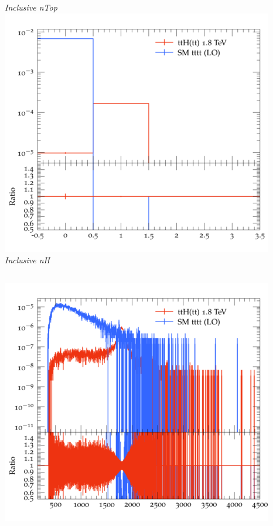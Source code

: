 \documentclass{beamer}
\begin{document}
\begin{frame}
\begin{columns}
\textit{\small Inclusive nTop}
\includegraphics[width=\textwidth]{../plots/ttH_1800/tttt_ttH/Inclusive_nH.png}\\
\textit{\small Inclusive nH}
\end{columns}
\begin{columns}
\includegraphics[width=\textwidth]{../plots/ttH_1800/tttt_ttH/Inclusive_InvM_ttbar12.png}\\

\end{columns}
\end{frame}
\end{document}

